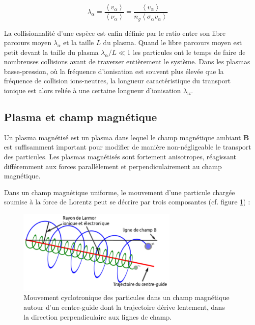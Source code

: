 \begin{refsection}
\begin{equation}
	\lambda_\alpha=\frac{\left<v_\alpha\right>}{\left<\nu_\alpha\right>}
	=\frac{\left<v_\alpha\right>}{n_g\left<\sigma_\alpha v_\alpha\right>}
\end{equation} 

La collisionnalité d'une espèce est enfin
définie par le ratio entre son libre parcours moyen $\lambda_\alpha$ et la
taille $L$ du plasma. Quand le libre parcours moyen est petit devant la
taille du plasma $\lambda_\alpha/L\ll 1$
les particules ont le temps de faire de nombreuses collisions avant de
traverser entièrement le système. Dans les plasmas basse-pression, où la
fréquence d'ionisation est souvent plus élevée que la fréquence de collision
ions-neutres, la longueur caractéristique du transport ionique est alors reliée
à une certaine longueur d'ionisation $\lambda_\text{iz}$.

\subsection{Plasma et champ magnétique} 
\label{1-plasma-champMag}
Un plasma magnétisé est un plasma dans lequel le champ magnétique ambiant
$\mathbf{B}$ est suffisamment important pour modifier de manière
non-négligeable le transport des particules. Les plasmas magnétisés sont fortement
anisotropes, réagissant différemment aux forces parallèlement et
perpendiculairement au champ magnétique.

Dans un champ magnétique uniforme, le
mouvement d'une particule chargée soumise à la force de Lorentz peut se décrire
par trois composantes (cf. figure \ref{1-particleDrifts}) :

\begin{figure}[htbp]
\centering
\includegraphics[width=0.7\textwidth]{figures/1-mouvementCyclotron.png}
{\caption{Mouvement cyclotronique des particules dans un champ magnétique autour
d'un centre-guide dont la trajectoire dérive lentement, dans la direction
perpendiculaire aux lignes de champ.}\label{1-particleDrifts}}
\end{figure}


\end{refsection}
